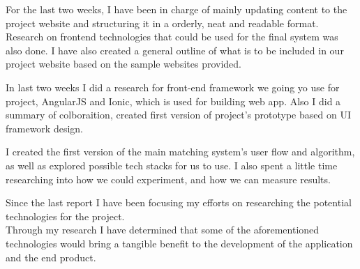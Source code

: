 \documentclass[11pt]{report}
\begin{document}
\bigskip
{}
\smallskip

\noindent
For the last two weeks, I have been in charge of mainly updating content to the project website and structuring it in a orderly, neat and readable format. Research on frontend technologies that could be used for the final system was also done. I have also created a general outline of what is to be included in our project website based on the sample websites provided.\\

\bigskip
{}
\smallskip

\noindent
In last two weeks I did a research for front-end framework we going yo use for project, AngularJS and Ionic, which is used for building web app. Also I did a summary of colboraition, created first version of project’s prototype based on UI framework design.\\

\bigskip
{}
\smallskip

I created the first version of the main matching system's user flow and algorithm, as well as explored possible tech stacks for us to use. I also spent a little time researching into how we could experiment, and how we can measure results.

\noindent
Since the last report I have been focusing my efforts on researching the potential technologies for the project. \\

\noindent
Through my research I have determined that some of the aforementioned technologies would bring a tangible benefit to the development of the application and the end product. \\

\bigskip
%
%
%
{}
\smallskip
\end{document}
